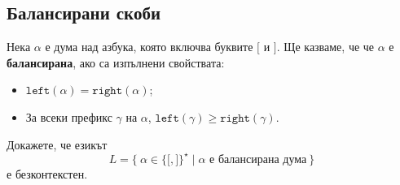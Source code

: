 \subsection{Балансирани скоби}

Нека $\alpha$ е дума над азбука, която включва буквите $\texttt{[}$ и $\texttt{]}$. 
Ще казваме, че че $\alpha$ е {\bf балансирана}, ако са изпълнени свойствата:
\begin{itemize}
\item 
  $\texttt{left}(\alpha) = \texttt{right}(\alpha)$;
\item
  За всеки префикс $\gamma$ на $\alpha$,
  $\texttt{left}(\gamma) \geq \texttt{right}(\gamma)$.
\end{itemize}

\begin{framed}
  \begin{problem}
    Докажете, че езикът 
    \[L = \{\ \alpha \in \{\texttt{[},\texttt{]}\}^\star \mid \alpha\text{ е балансирана дума}\ \}\]
    е безконтекстен.
  \end{problem}  
\end{framed}
